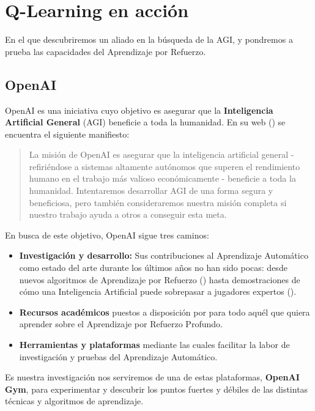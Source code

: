 \chapter{Q-Learning en acción}
\label{cap:q-learning}

En el que descubriremos un aliado en la búsqueda de la AGI, y pondremos a prueba las capacidades del Aprendizaje por Refuerzo.


\section{OpenAI}
OpenAI es una iniciativa cuyo objetivo es asegurar que la \textbf{Inteligencia Artificial General} (AGI) beneficie a toda la humanidad. En su web (\citet{OpenAI_charter}) se encuentra el siguiente manifiesto:

\begin{quote}
    La misión de OpenAI es asegurar que la inteligencia artificial general - refiriéndose a sistemas altamente autónomos que superen el rendimiento humano en el trabajo más valioso económicamente - beneficie a toda la humanidad. Intentaremos desarrollar AGI de una forma segura y beneficiosa, pero también consideraremos nuestra misión completa si nuestro trabajo ayuda a otros a conseguir esta meta. 
\end{quote}

En busca de este objetivo, OpenAI sigue tres caminos:
\begin{itemize}
    \item \textbf{Investigación y desarrollo:} Sus contribuciones al Aprendizaje Automático como estado del arte durante los últimos años no han sido pocas: desde nuevos algoritmos de Aprendizaje por Refuerzo (\citet{baselines}) hasta demostraciones de cómo una Inteligencia Artificial puede sobrepasar a jugadores expertos (\citet{OpenAI_dota}).
    \item \textbf{Recursos académicos} puestos a disposición por \citet{spinningup} para todo aquél que quiera aprender sobre el Aprendizaje por Refuerzo Profundo.
    \item \textbf{Herramientas y plataformas} mediante las cuales facilitar la labor de investigación y pruebas del Aprendizaje Automático.
\end{itemize}

Es nuestra investigación nos serviremos de una de estas plataformas, \textbf{OpenAI Gym}, para experimentar y descubrir los puntos fuertes y débiles de las distintas técnicas y algoritmos de aprendizaje.

